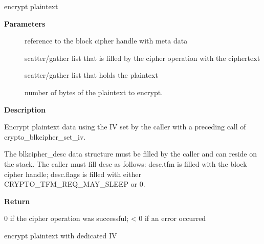 \documentclass[a4paper,8pt,english]{sphinxmanual}
\begin{document}
\begin{fulllineitems}
\label{crypto/api-skcipher:c.crypto_blkcipher_encrypt}
encrypt plaintext

\end{fulllineitems}


\textbf{Parameters}
\begin{description}
\item[{}] \leavevmode
reference to the block cipher handle with meta data

\item[{}] \leavevmode
scatter/gather list that is filled by the cipher operation with the
ciphertext

\item[{}] \leavevmode
scatter/gather list that holds the plaintext

\item[{}] \leavevmode
number of bytes of the plaintext to encrypt.

\end{description}

\textbf{Description}

Encrypt plaintext data using the IV set by the caller with a preceding
call of crypto\_blkcipher\_set\_iv.

The blkcipher\_desc data structure must be filled by the caller and can
reside on the stack. The caller must fill desc as follows: desc.tfm is filled
with the block cipher handle; desc.flags is filled with either
CRYPTO\_TFM\_REQ\_MAY\_SLEEP or 0.

\textbf{Return}

0 if the cipher operation was successful; \textless{} 0 if an error occurred

\begin{fulllineitems}
\label{crypto/api-skcipher:c.crypto_blkcipher_encrypt_iv}
encrypt plaintext with dedicated IV

\end{fulllineitems}
\end{document}
